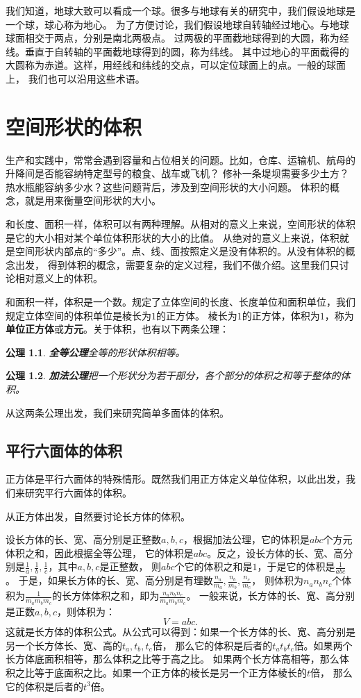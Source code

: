 \documentclass[12pt,UTF8]{ctexbook}
\newtheorem{po}{公理}
\begin{document}
我们知道，地球大致可以看成一个球。很多与地球有关的研究中，我们假设地球是一个球，球心称为地心。
为了方便讨论，我们假设地球自转轴经过地心。与地球球面相交于两点，分别是南北两极点。
过两极的平面截地球得到的大圆，称为经线。垂直于自转轴的平面截地球得到的圆，称为纬线。
其中过地心的平面截得的大圆称为赤道。这样，用经线和纬线的交点，可以定位球面上的点。一般的球面上，
我们也可以沿用这些术语。

\chapter{空间形状的体积}

生产和实践中，常常会遇到容量和占位相关的问题。比如，仓库、运输机、航母的升降间是否能容纳特定型号的粮食、战车或飞机？
修补一条堤坝需要多少土方？热水瓶能容纳多少水？这些问题背后，涉及到空间形状的大小问题。
体积的概念，就是用来衡量空间形状的大小。

和长度、面积一样，体积可以有两种理解。从相对的意义上来说，空间形状的体积是它的大小相对某个单位体积形状的大小的比值。
从绝对的意义上来说，体积就是空间形状内部点的“多少”。点、线、面按照定义是没有体积的。从没有体积的概念出发，
得到体积的概念，需要复杂的定义过程，我们不做介绍。这里我们只讨论相对意义上的体积。

和面积一样，体积是一个数。规定了立体空间的长度、长度单位和面积单位，我们规定立体空间的体积单位是棱长为$1$的正方体。
棱长为$1$的正方体，体积为$1$，称为\textbf{单位正方体}或\textbf{方元}。关于体积，也有以下两条公理：
\begin{po}{\textbf{全等公理}}\label{po:4}
    全等的形状体积相等。
\end{po}
\begin{po}{\textbf{加法公理}}\label{po:5}
    把一个形状分为若干部分，各个部分的体积之和等于整体的体积。
\end{po}
从这两条公理出发，我们来研究简单多面体的体积。

\section{平行六面体的体积}

正方体是平行六面体的特殊情形。既然我们用正方体定义单位体积，以此出发，我们来研究平行六面体的体积。

从正方体出发，自然要讨论长方体的体积。

设长方体的长、宽、高分别是正整数$a,b,c$，根据加法公理，它的体积是$abc$个方元体积之和，因此根据全等公理，
它的体积是$abc$。反之，设长方体的长、宽、高分别是$\frac{1}{a},\frac{1}{b},\frac{1}{c}$，其中$a,b,c$是正整数，
则$abc$个它的体积之和是$1$，于是它的体积是$\frac{1}{abc}$。
于是，如果长方体的长、宽、高分别是有理数$\frac{n_a}{m_a},\frac{n_b}{m_b},\frac{n_c}{m_c}$，
则体积为$n_an_bn_c$个体积为$\frac{1}{m_am_bm_c}$的长方体体积之和，即为$\frac{n_an_bn_c}{m_am_bm_c}$。
一般来说，长方体的长、宽、高分别是正数$a,b,c$，则体积为：
$$ V = abc.$$
这就是长方体的体积公式。从公式可以得到：如果一个长方体的长、宽、高分别是另一个长方体长、宽、高的$t_a,t_b,t_c$倍，
那么它的体积是后者的$t_at_bt_c$倍。如果两个长方体底面积相等，那么体积之比等于高之比。
如果两个长方体高相等，那么体积之比等于底面积之比。如果一个正方体的棱长是另一个正方体棱长的$t$倍，
那么它的体积是后者的$t^3$倍。
\end{document}
